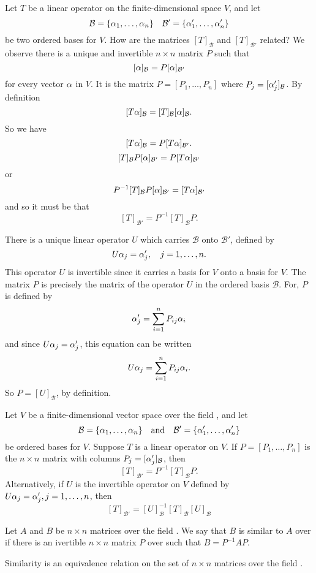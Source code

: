 \documentclass{mynotes}
\begin{document}
Let $T$ be a linear operator on the finite-dimensional space $V$, and let $$\mathcal{B}=\{\alpha_1,\ldots,\alpha_n\}\quad \mathcal{B'}=\{\alpha_1',\ldots,\alpha_n'\}$$be two ordered bases for $V$. How are the matrices $[T]_{\mathcal{B}}$ and $[T]_{\mathcal{B'}}$ related?
We observe there is a unique and invertible $n\times n$ matrix $P$ such that $$[\alpha]_{\mathcal{B}}=P[\alpha]_{\mathcal{B'}}$$for every vector $\alpha$ in $V$. It is the matrix $P=[P_1,\ldots,P_n]$ where $P_j = [\alpha_j']_{\mathcal{B}}$. By definition$$[T\alpha]_{\mathcal{B}}=[T]_{\mathcal{B}}[\alpha]_{\mathcal{B}}.$$So we have $$[T\alpha]_{\mathcal{B}} = P[T\alpha]_{\mathcal{B'}}.$$ $$[T]_{\mathcal{B}}P[\alpha]_{\mathcal{B'}}=P[T\alpha]_{\mathcal{B'}}$$or$$P^{-1}[T]_{\mathcal{B}}P[\alpha]_{\mathcal{B'}}=[T\alpha]_{\mathcal{B'}}$$ and so it must be that $$[T]_{\mathcal{B'}}=P^{-1}[T]_{\mathcal{B}}P.$$
\begin{remark}
There is a unique linear operator $U$ which carries $\mathcal{B}$ onto $\mathcal{B'}$, defined by $$U\alpha_j=\alpha_j',\quad j=1,\ldots,n.$$This operator $U$ is invertible since it carries a basis for $V$ onto a basis for $V$. The matrix $P$ is precisely the matrix of the operator $U$ in the ordered basis $\mathcal{B}$. For, $P$ is defined by $$\alpha_j'=\sum_{i=1}^nP_{ij}\alpha_i$$and since $U\alpha_j=\alpha_j'$, this equation can be written $$U\alpha_j=\sum_{i=1}^nP_{ij}\alpha_i.$$So $P=[U]_{\mathcal{B}}$, by definition.
\end{remark}
\begin{theorem}
Let $V$ be a finite-dimensional vector space over the field \F, and let $$\mathcal{B} =\{\alpha_1,\ldots,\alpha_n\}\quad\mbox{and}\quad\mathcal{B'}=\{\alpha_1',\ldots,\alpha_n'\}$$be ordered bases for $V$. Suppose $T$ is a linear operator on $V$. If $P=[P_1,\ldots,P_n]$ is the $n\times n$ matrix with columns $P_j = [\alpha_j']_{\mathcal{B}}$, then $$[T]_{\mathcal{B'}} = P^{-1}[T]_{\mathcal{B}}P.$$Alternatively, if $U$ is the invertible operator on $V$ defined by $U\alpha_j=\alpha_j',j=1,\ldots,n$, then $$[T]_{\mathcal{B'}} = [U]_{\mathcal{B}}^{-1}[T]_{\mathcal{B}}[U]_{\mathcal{B}}$$
\end{theorem}
\begin{definition}[similar]
Let $A$ and $B$ be $n\times n$ matrices over the field \F. We say that $B$ is similar to $A$ over \F if there is an ivertible $n\times n$ matrix $P$ over \F such that $B=P^{-1}AP.$
\end{definition}
\begin{remark}
Similarity is an equivalence relation on the set of $n\times n$ matrices over the field \F.
\end{remark}
\end{document}
